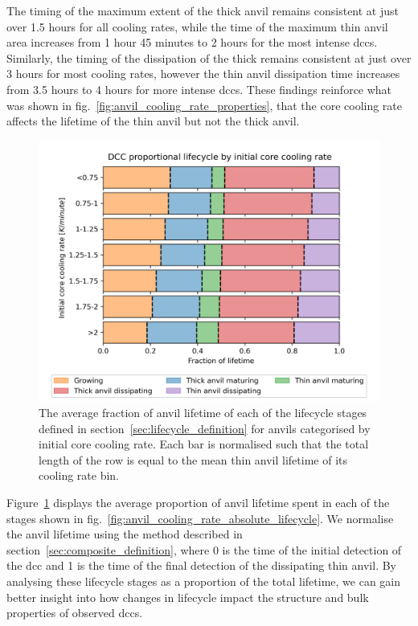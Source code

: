 The timing of the maximum extent of the thick anvil remains consistent at just over 1.5 hours for all cooling rates, while the time of the maximum thin anvil area increases from 1 hour 45 minutes to 2 hours for the most intense \acrshort{dcc}s.
Similarly, the timing of the dissipation of the thick remains consistent at just over 3 hours for most cooling rates, however the thin anvil dissipation time increases from 3.5 hours to 4 hours for more intense \acrshort{dcc}s.
These findings reinforce what was shown in fig.~\ref{fig:anvil_cooling_rate_properties}, that the core cooling rate affects the lifetime of the thin anvil but not the thick anvil.

\begin{figure}[tp]
    \centering
    \includegraphics[width=\textwidth]{figures/chapter3_10.png}
    \caption[
    The average fraction of anvil lifetime of each lifecycle stage for anvils categorised by initial core cooling rate
    ]{
    The average fraction of anvil lifetime of each of the lifecycle stages defined in section~\ref{sec:lifecycle_definition} for anvils categorised by initial core cooling rate. Each bar is normalised such that the total length of the row is equal to the mean thin anvil lifetime of its cooling rate bin.
    }
    \label{fig:anvil_cooling_rate_proportional_lifecycle}
\end{figure}

Figure~\ref{fig:anvil_cooling_rate_proportional_lifecycle} displays the average proportion of anvil lifetime spent in each of the stages shown in fig.~\ref{fig:anvil_cooling_rate_absolute_lifecycle}.
We normalise the anvil lifetime using the method described in section~\ref{sec:composite_definition}, where 0 is the time of the initial detection of the \acrshort{dcc} and 1 is the time of the final detection of the dissipating thin anvil.
By analysing these lifecycle stages as a proportion of the total lifetime, we can gain better insight into how changes in lifecycle impact the structure and bulk properties of observed \acrshort{dcc}s.

